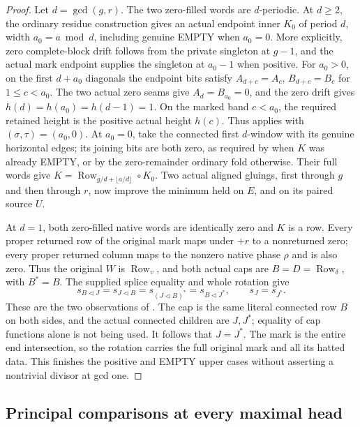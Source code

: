 \documentclass[11pt,a4paper]{amsart}
\numberwithin{equation}{section}
\theoremstyle{plain}
\theoremstyle{definition}
\newcommand{\Row}{\operatorname{Row}}
\begin{document}
\begin{proof}
Let \(d=\gcd(g,r)\).  The two zero-filled words are \(d\)-periodic.
At \(d\ge2\), the ordinary residue construction gives an actual
endpoint inner \(K_0\) of period \(d\), width \(a_0=a\bmod d\),
including genuine EMPTY when \(a_0=0\).  More explicitly, zero
complete-block drift follows from the private singleton at \(g-1\),
and the actual mark endpoint supplies the singleton at \(a_0-1\)
when positive.  For \(a_0>0\), on the first \(d+a_0\) diagonals the endpoint
bits satisfy \(A_{d+c}=A_c\), \(B_{d+c}=B_c\) for \(1\le c<a_0\).
The two actual zero seams give \(A_d=B_{a_0}=0\), and the
zero drift gives \(h(d)=h(a_0)=h(d-1)=1\).
On the marked band \(c<a_0\), the required retained height is
the positive actual height \(h(c)\).  Thus
\cite[Ordinary cell criterion]{Shields2026Gluing} applies with
\((\sigma,\tau)=(a_0,0)\).  At \(a_0=0\), take the connected
first \(d\)-window with its genuine horizontal edges; its joining
bits are both zero, as required by
\cite[Empty residue fold]{Shields2026Gluing} when \(K\) was already
EMPTY, or by the zero-remainder ordinary fold otherwise.
Their full words give
\(K=\Row_{g/d+\lfloor a/d\rfloor}\circ K_0\).
Two actual aligned gluings, first through \(g\) and then through
\(r\), now improve the minimum held on \(E\), and on its paired
source \(U\).

At \(d=1\), both zero-filled native words are identically zero and
\(K\) is a row.  Every proper returned row of the original mark
maps under \(+r\) to a nonreturned zero; every proper returned
column maps to the nonzero native phase \(\rho\) and is also zero.
Thus the original \(W\) is \(\Row_v\), and both actual caps are
\(B=D=\Row_\delta\), with \(B^*=B\).  The supplied splice equality
and whole rotation give
\[
 s_{B\triangleleft J}=s_{J\triangleleft B}
   =s_{(J\triangleleft B)^*}=s_{B\triangleleft J^*},
 \qquad s_J=s_{J^*}.
\]
These are the two observations of
\cite[Fixed-cap rigidity]{Shields2026Coframes}.  The cap is the same
literal connected row \(B\) on both sides, and the actual connected
children are \(J,J^*\); equality of cap functions alone is not being used.
It follows that \(J=J^*\).  The mark is the entire end intersection,
so the rotation
carries the full original mark and all its hatted data.  This finishes
the positive and EMPTY upper cases without asserting a nontrivial divisor
at gcd one.
\end{proof}

\subsection{Principal comparisons at every maximal head}
\end{document}
